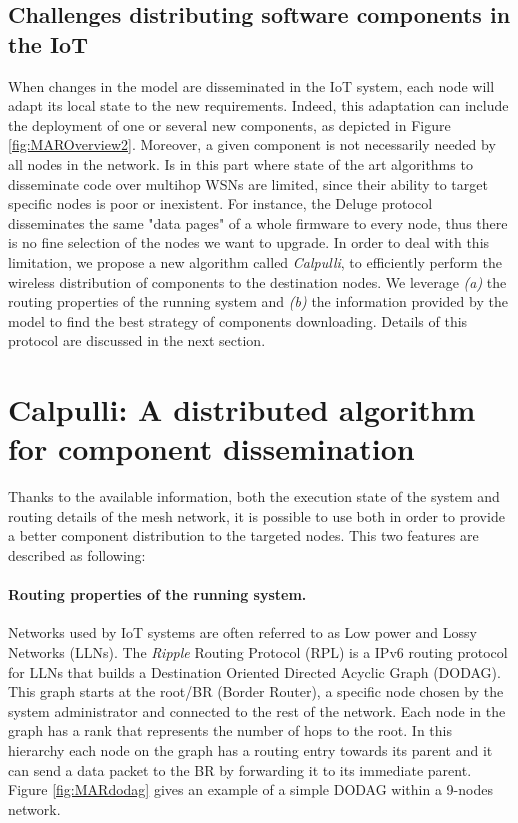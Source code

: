 \subsection{Challenges distributing software components in the IoT}
When changes in the model are disseminated in the IoT system, each node will adapt its local state to the new requirements. 
Indeed, this adaptation can include the deployment of one or several new components, as depicted in Figure \ref{fig:MAROverview2}. 
Moreover, a given component is not necessarily needed by all nodes in the network. 
Is in this part where state of the art algorithms to disseminate code over multihop WSNs are limited, since their ability to target specific nodes is poor or inexistent. 
For instance, the Deluge protocol\cite{hui2004dynamic} disseminates the same "data pages" of a whole firmware to every node, thus there is no fine selection of the nodes we want to upgrade. 
In order to deal with this limitation, we propose a new algorithm called \emph{Calpulli}, to efficiently perform the wireless distribution of components to the destination nodes. 
We leverage \textit{(a)} the routing properties of the running system and \textit{(b)} the information provided by the model to find the best strategy of components downloading.
Details of this protocol are discussed in the next section.

\section{Calpulli: A distributed algorithm for component dissemination}
Thanks to the available information, both the execution state of the system and routing details of the mesh network, it is possible to use both in order to provide a better component distribution to the targeted nodes.
This two features are described as following:

\paragraph{Routing properties of the running system.} Networks used by IoT systems are often referred to as Low power and Lossy Networks (LLNs). The \emph{Ripple} Routing Protocol (RPL)\cite{rfc6550} is a IPv6 routing protocol for LLNs that builds a Destination Oriented Directed Acyclic Graph (DODAG). This graph starts at the root/BR (Border Router), a specific node chosen by the system administrator and connected to the rest of the network. Each node in the graph has a rank that represents the number of hops to the root. In this hierarchy each node on the graph has a routing entry towards its parent and it can send a data packet to the BR by forwarding it to its immediate parent. Figure \ref{fig:MARdodag} gives an example of a simple DODAG within a 9-nodes network.

